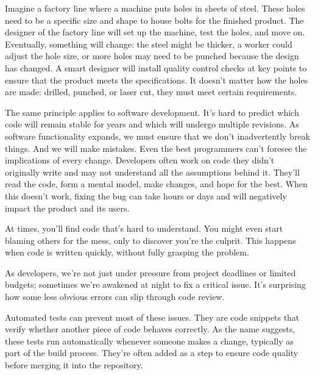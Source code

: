 Imagine a factory line where a machine puts holes in sheets of steel. These holes need to be a specific size and shape to house bolts for the finished product. The designer of the factory line will set up the machine, test the holes, and move on. Eventually, something will change: the steel might be thicker, a worker could adjust the hole size, or more holes may need to be punched because the design has changed. A smart designer will install quality control checks at key points to ensure that the product meets the specifications. It doesn’t matter how the holes are made: drilled, punched, or laser cut, they must meet certain requirements.

The same principle applies to software development. It’s hard to predict which code will remain stable for years and which will undergo multiple revisions. As software functionality expands, we must ensure that we don’t inadvertently break things. And we will make mistakes. Even the best programmers can’t foresee the implications of every change. Developers often work on code they didn’t originally write and may not understand all the assumptions behind it. They’ll read the code, form a mental model, make changes, and hope for the best. When this doesn’t work, fixing the bug can take hours or days and will negatively impact the product and its users.

At times, you’ll find code that’s hard to understand. You might even start blaming others for the mess, only to discover you’re the culprit. This happens when code is written quickly, without fully grasping the problem.

As developers, we’re not just under pressure from project deadlines or limited budgets; sometimes we’re awakened at night to fix a critical issue. It’s surprising how some less obvious errors can slip through code review.

Automated tests can prevent most of these issues. They are code snippets that verify whether another piece of code behaves correctly. As the name suggests, these tests run automatically whenever someone makes a change, typically as part of the build process. They’re often added as a step to ensure code quality before merging it into the repository.


